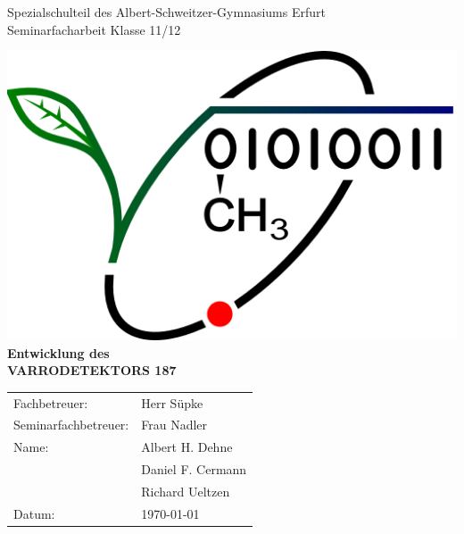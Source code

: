 \documentclass[11pt,a4paper]{article}
\begin{document}
\begin{center}
\Large{Spezialschulteil des Albert-Schweitzer-Gymnasiums Erfurt}\\[1.5ex]
\large{Seminarfacharbeit Klasse 11/12}
\end{center}
\normalsize


\thispagestyle{empty}
\vspace*{2cm} %
\begin{center}
\includegraphics[scale=.4]{images/logo}\\
\vspace*{2cm}
\Huge{\textbf{Entwicklung des \\VARRODETEKTORS 187}} 

\end{center}
\normalsize

\vspace*{4cm}
\Large{ %
\begin{tabular}{ll}
Fachbetreuer: & Herr Süpke \\
Seminarfachbetreuer: & Frau Nadler \\

Name: & Albert H. Dehne \\
& Daniel F. Cermann\\
& Richard Ueltzen\\

Datum: & \today
\end{tabular}
}
\normalsize %

\newpage

\thispagestyle{empty}
\setcounter{page}{1}
\tableofcontents
\newpage


\end{document}
